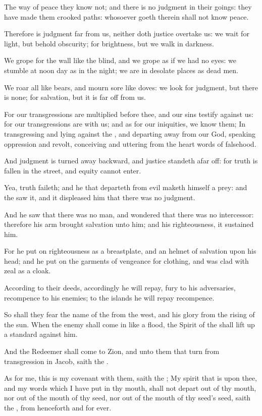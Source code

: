 \Verse The way of peace they know not; and there is no judgment in their goings: they have made them crooked paths: whosoever goeth therein shall not know peace.

\Verse Therefore is judgment far from us, neither doth justice overtake us: we wait for light, but behold obscurity; for brightness, but we walk in darkness.

\Verse We grope for the wall like the blind, and we grope as if we had no eyes: we stumble at noon day as in the night; we are in desolate places as dead men.

\Verse We roar all like bears, and mourn sore like doves: we look for judgment, but there is none; for salvation, but it is far off from us.

\Verse For our transgressions are multiplied before thee, and our sins testify against us: for our transgressions are with us; and as for our iniquities, we know them; \Verse In transgressing and lying against the \LORD, and departing away from our God, speaking oppression and revolt, conceiving and uttering from the heart words of falsehood.

\Verse And judgment is turned away backward, and justice standeth afar off: for truth is fallen in the street, and equity cannot enter.

\Verse Yea, truth faileth; and he that departeth from evil maketh himself a prey: and the \LORD saw it, and it displeased him that there was no judgment.

\Verse And he saw that there was no man, and wondered that there was no intercessor: therefore his arm brought salvation unto him; and his righteousness, it sustained him.

\Verse For he put on righteousness as a breastplate, and an helmet of salvation upon his head; and he put on the garments of vengeance for clothing, and was clad with zeal as a cloak.

\Verse According to their deeds, accordingly he will repay, fury to his adversaries, recompence to his enemies; to the islands he will repay recompence.

\Verse So shall they fear the name of the \LORD from the west, and his glory from the rising of the sun. When the enemy shall come in like a flood, the Spirit of the \LORD shall lift up a standard against him.

\Verse And the Redeemer shall come to Zion, and unto them that turn from transgression in Jacob, saith the \LORD.

\Verse As for me, this is my covenant with them, saith the \LORD; My spirit that is upon thee, and my words which I have put in thy mouth, shall not depart out of thy mouth, nor out of the mouth of thy seed, nor out of the mouth of thy seed's seed, saith the \LORD, from henceforth and for ever.


